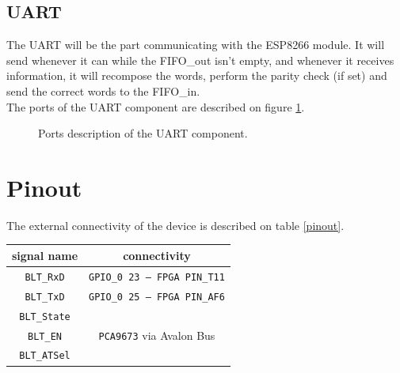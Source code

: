 \documentclass[11pt]{article}
\begin{document}
\subsection{UART}
The UART will be the part communicating with the ESP8266 module. It will send whenever it can while the FIFO\_out isn't empty, and whenever it receives information, it will recompose the words, perform the parity check (if set) and send the correct words to the FIFO\_in.
\\
The ports of the UART component are described on figure \ref{uart_ports}.
\begin{figure}[H]
        \caption{Ports description of the UART component.}
        \label{uart_ports}
\end{figure}
\pagebreak
\section{Pinout}
The external connectivity of the device is described on table \ref{pinout}.
\begin{center}
\label{pinout}
\begin{tabular}{|c|c|}
\hline
signal name & connectivity\\
\hline
\texttt{BLT\_RxD} & \texttt{GPIO\_0 23 -- FPGA PIN\_T11}\\
\hline
\texttt{BLT\_TxD} & \texttt{GPIO\_0 25 -- FPGA PIN\_AF6}\\
\hline
\texttt{BLT\_State} & \multirow{3}{*}{\texttt{PCA9673} via Avalon Bus}\\
\cline{1-1}
\texttt{BLT\_EN} &\\
\cline{1-1}
\texttt{BLT\_ATSel} &\\
\hline
\end{tabular}
\end{center}
\end{document}
